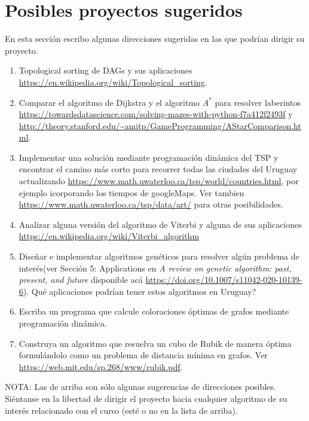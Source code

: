 \documentclass[12pt, a4paper]{article}
\begin{document}
\section{Posibles proyectos sugeridos}
En esta secci\'on escribo algunas direcciones sugeridas en las que podr\'ian dirigir su proyecto.  
\begin{enumerate}
\item Topological sorting de DAGs y sus aplicaciones \url{https://en.wikipedia.org/wiki/Topological_sorting}.
\item Comparar el algoritmo de Dijkstra y el algoritmo $A^*$ para resolver laberintos \url{https://towardsdatascience.com/solving-mazes-with-python-f7a412f2493f} y \url{http://theory.stanford.edu/~amitp/GameProgramming/AStarComparison.html}.

\item Implementar una solución mediante programación dinámica del TSP y encontrar el camino más corto para recorrer todas las ciudades del Uruguay actualizando \url{https://www.math.uwaterloo.ca/tsp/world/countries.html}, por ejemplo icorporando los tiempos de googleMaps. Ver tambien \url{https://www.math.uwaterloo.ca/tsp/data/art/} para otras posibilidades.

\item Analizar alguna versi\'on del algoritmo de Viterbi y alguna de sus aplicaciones \url{https://en.wikipedia.org/wiki/Viterbi_algorithm}

\item Diseñar e implementar algoritmos gen\'eticos para resolver algún problema de interés(ver Sección 5: Applications en \emph{A review on genetic algorithm: past, present, and future} disponible acá \url{https://doi.org/10.1007/s11042-020-10139-6}).  Qu\'e aplicaciones podr\'ian tener estos algoritmos en Uruguay?

\item Escriba un programa que calcule coloraciones óptimas de grafos mediante programación dinámica. 

\item Construya un algoritmo que resuelva un cubo de Rubik de manera \'optima formul\'andolo como un problema de distancia m\'inima en grafos. Ver \url{https://web.mit.edu/sp.268/www/rubik.pdf}.    

\end{enumerate}
NOTA: Las de arriba son s\'olo algunas sugerencias de direcciones posibles. Si\'entanse en la libertad de dirigir el proyecto hacia cualquier algoritmo de su inter\'es relacionado con el curso (est\'e o no en la lista de arriba). 
\end{document}
